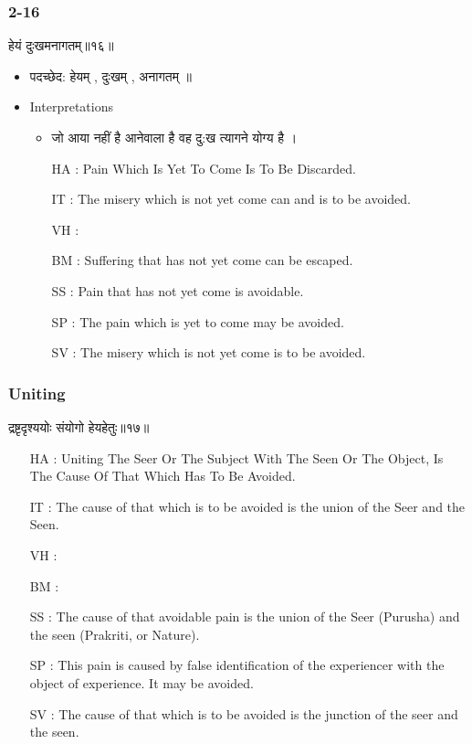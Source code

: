 \begin{frame}[fragile]\frametitle{2-16}
\begin{sanskrit}
हेयं दुःखमनागतम्॥१६॥
\end{sanskrit}

	\begin{itemize}
	\item पदच्छेद: हेयम् , दुःखम् , अनागतम् ॥
	\item Interpretations
		\begin{itemize}
		\item जो आया नहीं है आनेवाला है वह दु:ख त्यागने योग्य है ।
		\item [HA]: Pain Which Is Yet To Come Is To Be Discarded.
		\item [IT]: The misery which is not yet come can and is to be avoided.
		\item [VH]: 
		\item [BM]: Suffering that has not yet come can be escaped.
		\item [SS]: Pain that has not yet come is avoidable.
		\item [SP]: The pain which is yet to come may be avoided.
		\item [SV]: The misery which is not yet come is to be avoided. 
		\end{itemize}
	\end{itemize}
	
\end{frame}


\begin{frame}[fragile]\frametitle{Uniting}
\begin{sanskrit}
द्रष्टृदृश्ययोः संयोगो हेयहेतुः॥१७॥
\end{sanskrit}

	\begin{itemize}
	\item [HA]: Uniting The Seer Or The Subject With The Seen Or The Object, Is The Cause Of That Which Has To Be Avoided.
	\item [IT]: The cause of that which is to be avoided is the union of the Seer and the Seen.
	\item [VH]: 
	\item [BM]: 
	\item [SS]: The cause of that avoidable pain is the union of the Seer (Purusha) and the seen (Prakriti, or Nature).
	\item [SP]: This pain is caused by false identification of the experiencer with the object of experience. It may be avoided.
	\item [SV]: The cause of that which is to be avoided is the junction of the seer and the seen. 
	\end{itemize}
\end{frame}

